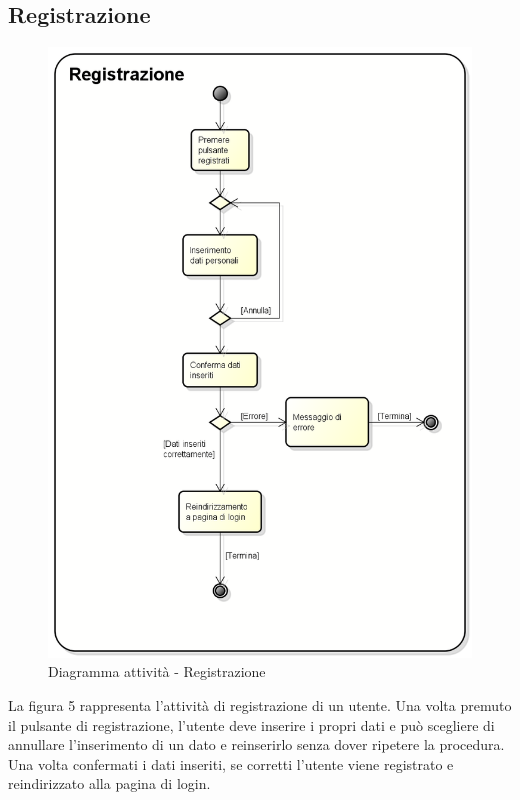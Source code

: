 \subsection{Registrazione}
\begin{figure}[h] 
	\centering 
	\includegraphics[scale=0.3] {img/Activity_registrazione.png} 
	\caption{Diagramma attività - Registrazione} 
\end{figure}
La figura 5 rappresenta l'attività di registrazione di un utente. Una volta premuto il pulsante di registrazione, l'utente deve inserire i propri dati e può scegliere di annullare l'inserimento di un dato e reinserirlo senza dover ripetere la procedura. Una volta confermati i dati inseriti, se corretti l'utente viene registrato e reindirizzato alla pagina di login.
\newpage



